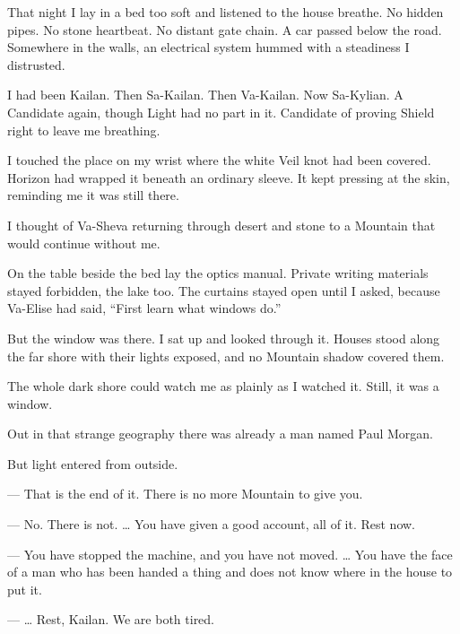 \ornament

That night I lay in a bed too soft and listened to the house breathe. No hidden pipes. No stone heartbeat. No distant gate chain. A car passed below the road. Somewhere in the walls, an electrical system hummed with a steadiness I distrusted.\par

I had been Kailan. Then Sa-Kailan. Then Va-Kailan. Now Sa-Kylian. A Candidate again, though Light had no part in it. Candidate of proving Shield right to leave me breathing.\par

I touched the place on my wrist where the white Veil knot had been covered. Horizon had wrapped it beneath an ordinary sleeve. It kept pressing at the skin, reminding me it was still there.\par

I thought of Va-Sheva returning through desert and stone to a Mountain that would continue without me.\par

On the table beside the bed lay the optics manual. Private writing materials stayed forbidden, the lake too. The curtains stayed open until I asked, because Va-Elise had said, ``First learn what windows do.''\par

But the window was there. I sat up and looked through it. Houses stood along the far shore with their lights exposed, and no Mountain shadow covered them.\par

The whole dark shore could watch me as plainly as I watched it. Still, it was a window.\par

Out in that strange geography there was already a man named Paul Morgan.\par

But light entered from outside.\par

\ornament

\begin{room}

--- That is the end of it. There is no more Mountain to give you.

--- No. There is not. \ldots{} You have given a good account, all of it. Rest now.

--- You have stopped the machine, and you have not moved. \ldots{} You have the face of a man who has been handed a thing and does not know where in the house to put it.

--- \ldots{} Rest, Kailan. We are both tired.

\end{room}

\ornament
